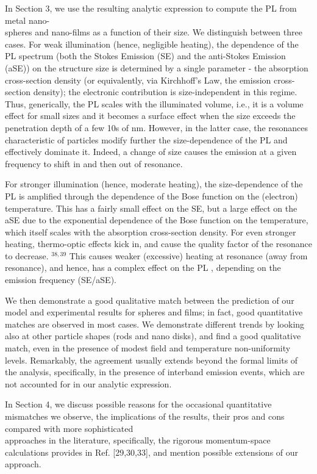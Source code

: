 \documentclass[10pt]{article}
\begin{document}
In Section 3, we use the resulting analytic expression to compute the PL from metal nano-\\
spheres and nano-films as a function of their size. We distinguish between three cases. For weak illumination (hence, negligible heating), the dependence of the PL spectrum (both the Stokes Emission (SE) and the anti-Stokes Emission (aSE)) on the structure size is determined by a single parameter - the absorption cross-section density (or equivalently, via Kirchhoff's Law, the emission cross-section density); the electronic contribution is size-independent in this regime. Thus, generically, the PL scales with the illuminated volume, i.e., it is a volume effect for small sizes and it becomes a surface effect when the size exceeds the penetration depth of a few 10s of nm. However, in the latter case, the resonances characteristic of particles modify further the size-dependence of the PL and effectively dominate it. Indeed, a change of size causes the emission at a given frequency to shift in and then out of resonance.

For stronger illumination (hence, moderate heating), the size-dependence of the PL is amplified through the dependence of the Bose function on the (electron) temperature. This has a fairly small effect on the SE, but a large effect on the aSE due to the exponential dependence of the Bose function on the temperature, which itself scales with the absorption cross-section density. For even stronger heating, thermo-optic effects kick in, and cause the quality factor of the resonance to decrease. ${ }^{38,39}$ This causes weaker (excessive) heating at resonance (away from resonance), and hence, has a complex effect on the PL , depending on the emission frequency (SE/aSE).

We then demonstrate a good qualitative match between the prediction of our model and experimental results for spheres and films; in fact, good quantitative matches are observed in most cases. We demonstrate different trends by looking also at other particle shapes (rods and nano disks), and find a good qualitative match, even in the presence of modest field and temperature non-uniformity levels. Remarkably, the agreement usually extends beyond the formal limits of the analysis, specifically, in the presence of interband emission events, which are not accounted for in our analytic expression.

In Section 4, we discuss possible reasons for the occasional quantitative mismatches we observe, the implications of the results, their pros and cons compared with more sophisticated\\[0pt]
approaches in the literature, specifically, the rigorous momentum-space calculations provides in Ref. [29,30,33], and mention possible extensions of our approach.
\end{document}

